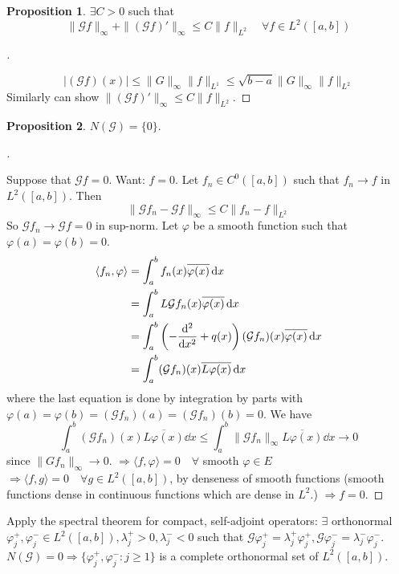 \documentclass{article}
\theoremstyle{definition}
\newtheorem{prop}{Proposition}
\newenvironment{proofs}[1][\proofname]{%
  \begin{proof}[#1]$ $\par\nobreak\ignorespaces
}{%
  \end{proof}
}
\newcommand{\G}{\mathcal G}
\begin{document}
\begin{prop}
	$\exists C > 0$ such that
	\[
		\| \G f\|_{\infty} + \|(\G f)'\|_{\infty} \leq C \| f\|_{L^2} \quad \forall f \in L^2([a, b])
	\]
\end{prop}

\begin{proofs}
	\[
		|(\G f)(x)| \leq \|G\|_\infty \|f\|_{L^1} \leq \sqrt{b - a} \|G\|_{\infty} \|f\|_{L^2}
	\]
	Similarly can show $\|(\G f)'\|_{\infty} \leq C \|f\|_{L^2}$.
\end{proofs}

\begin{prop}
	$N(\G) = \{0\}$.
\end{prop}

\begin{proofs}
	Suppose that $\G f = 0$.
	Want: $f = 0$.
	Let $f_n \in C^0([a, b])$ such that $f_n \to f$ in $L^2([a, b])$.
	Then 
	\[
		\|\G f_n - \G f\|_{\infty} \leq C \|f_n - f\|_{L^2}
	\]
	So $\G f_n \to \G f = 0$ in sup-norm.
	Let $\varphi$ be a smooth function such that $\varphi(a) = \varphi(b) = 0$.
	\[
		\begin{split}
			\langle f_n , \varphi \rangle &= \int_a^b f_n(x) \overline{\varphi(x)} \dd{x}\\
			&= \int_a^b L \G f_n(x) \overline{\varphi(x)} \dd{x}\\
			&= \int_a^b \left( - \dv[2]{x} + q(x) \right)(\G f_n)(x) \overline{\varphi(x)} \dd{x}\\
			&= \int_a^b (\G f_n)(x) \overline{L \varphi(x)} \dd{x}
		\end{split}
	\]	
	where the last equation is done by integration by parts with $\varphi(a) = \varphi(b) = (\G f_n)(a) = (\G f_n)(b) = 0$.
	We have
	\[
		\int_a^b (\G f_n)(x) \overline{L \varphi(x)} \dd{x} \leq \int_a^b \|\G f_n\|_\infty \overline{L \varphi(x)} \dd{x} \to 0
	\]
	since $\|G f_n\|_\infty \to 0$.
	$\Rightarrow \langle f, \varphi \rangle = 0 \quad \forall$ smooth $\varphi \in E$
	$\Rightarrow \langle f, g \rangle = 0 \quad \forall g \in L^2([a, b])$, by denseness of smooth functions (smooth functions dense in continuous functions which are dense in $L^2$.)
	$\Rightarrow f = 0$.
\end{proofs}

Apply the spectral theorem for compact, self-adjoint operators:
$\exists$ orthonormal $\varphi_j^+, \varphi_j^- \in L^2([a, b]), \lambda_j^+ > 0, \lambda_j^- < 0$ such that $\G \varphi_j^+ = \lambda_j^+ \varphi_j^+, \G \varphi_j^- = \lambda_j^- \varphi_j^-$.
$N(\G) = 0 \Rightarrow \{\varphi_j^+, \varphi_j^-: j \geq 1\}$ is a complete orthonormal set of $L^2([a, b])$.
\end{document}
